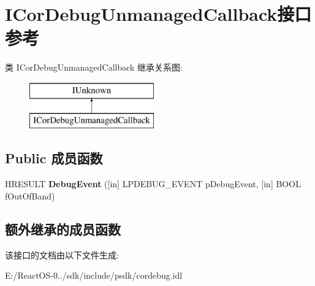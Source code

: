 \hypertarget{interface_i_cor_debug_unmanaged_callback}{}\section{I\+Cor\+Debug\+Unmanaged\+Callback接口 参考}
\label{interface_i_cor_debug_unmanaged_callback}
类 I\+Cor\+Debug\+Unmanaged\+Callback 继承关系图\+:\begin{figure}[H]
\begin{center}
\leavevmode
\includegraphics[height=2.000000cm]{interface_i_cor_debug_unmanaged_callback}
\end{center}
\end{figure}
\subsection*{Public 成员函数}
\begin{DoxyCompactItemize}
\item 
\mbox{\label{interface_i_cor_debug_unmanaged_callback_a89bd0bc519d83a3306f838d3179a8a7f}} 
H\+R\+E\+S\+U\+LT {\bfseries Debug\+Event} (\mbox{[}in\mbox{]} L\+P\+D\+E\+B\+U\+G\+\_\+\+E\+V\+E\+NT p\+Debug\+Event, \mbox{[}in\mbox{]} B\+O\+OL f\+Out\+Of\+Band)
\end{DoxyCompactItemize}
\subsection*{额外继承的成员函数}


该接口的文档由以下文件生成\+:\begin{DoxyCompactItemize}
\item 
E\+:/\+React\+O\+S-\/0../sdk/include/psdk/cordebug.\+idl\end{DoxyCompactItemize}
